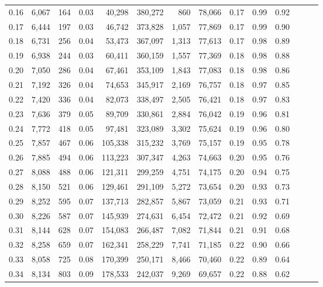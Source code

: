 \begin{tabular}{rrrrrrrrrrrrrr}
0.16 &  6,067 &    164 &  0.03 &   40,298 &  380,272 &     860 &  78,066 &  0.17 &  0.99 &      0.92 \\
0.17 &  6,444 &    197 &  0.03 &   46,742 &  373,828 &   1,057 &  77,869 &  0.17 &  0.99 &      0.90 \\
0.18 &  6,731 &    256 &  0.04 &   53,473 &  367,097 &   1,313 &  77,613 &  0.17 &  0.98 &      0.89 \\
0.19 &  6,938 &    244 &  0.03 &   60,411 &  360,159 &   1,557 &  77,369 &  0.18 &  0.98 &      0.88 \\
0.20 &  7,050 &    286 &  0.04 &   67,461 &  353,109 &   1,843 &  77,083 &  0.18 &  0.98 &      0.86 \\
0.21 &  7,192 &    326 &  0.04 &   74,653 &  345,917 &   2,169 &  76,757 &  0.18 &  0.97 &      0.85 \\
0.22 &  7,420 &    336 &  0.04 &   82,073 &  338,497 &   2,505 &  76,421 &  0.18 &  0.97 &      0.83 \\
0.23 &  7,636 &    379 &  0.05 &   89,709 &  330,861 &   2,884 &  76,042 &  0.19 &  0.96 &      0.81 \\
0.24 &  7,772 &    418 &  0.05 &   97,481 &  323,089 &   3,302 &  75,624 &  0.19 &  0.96 &      0.80 \\
0.25 &  7,857 &    467 &  0.06 &  105,338 &  315,232 &   3,769 &  75,157 &  0.19 &  0.95 &      0.78 \\
0.26 &  7,885 &    494 &  0.06 &  113,223 &  307,347 &   4,263 &  74,663 &  0.20 &  0.95 &      0.76 \\
0.27 &  8,088 &    488 &  0.06 &  121,311 &  299,259 &   4,751 &  74,175 &  0.20 &  0.94 &      0.75 \\
0.28 &  8,150 &    521 &  0.06 &  129,461 &  291,109 &   5,272 &  73,654 &  0.20 &  0.93 &      0.73 \\
0.29 &  8,252 &    595 &  0.07 &  137,713 &  282,857 &   5,867 &  73,059 &  0.21 &  0.93 &      0.71 \\
0.30 &  8,226 &    587 &  0.07 &  145,939 &  274,631 &   6,454 &  72,472 &  0.21 &  0.92 &      0.69 \\
0.31 &  8,144 &    628 &  0.07 &  154,083 &  266,487 &   7,082 &  71,844 &  0.21 &  0.91 &      0.68 \\
0.32 &  8,258 &    659 &  0.07 &  162,341 &  258,229 &   7,741 &  71,185 &  0.22 &  0.90 &      0.66 \\
0.33 &  8,058 &    725 &  0.08 &  170,399 &  250,171 &   8,466 &  70,460 &  0.22 &  0.89 &      0.64 \\
0.34 &  8,134 &    803 &  0.09 &  178,533 &  242,037 &   9,269 &  69,657 &  0.22 &  0.88 &      0.62 \\

\end{tabular}
